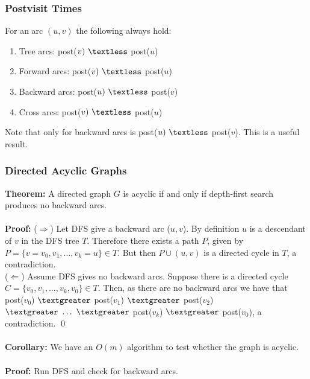 \documentclass{article}
\newcommand{\lt}{\textless}
\newcommand{\gt}{\textgreater}
\newcommand{\imply}{\Rightarrow}
\newcommand{\thm}{\textbf{Theorem: }}
\newcommand{\cor}{\textbf{Corollary: }}
\newcommand{\proo}{\textbf{Proof: }}
\begin{document}
\subsubsection{Postvisit Times}
For an arc $(u, v)$ the following always hold:
\begin{enumerate}
	\item Tree arcs: post($v)\ \lt$ post($u$)
	\item Forward arcs: post($v)\ \lt$ post($u$)
	\item Backward arcs: post($u)\ \lt$ post($v$)
	\item Cross arcs: post($v)\ \lt$ post($u$)
\end{enumerate}
Note that only for backward arcs is post($u)\ \lt$ post($v$). This is a useful result.
\subsubsection{Directed Acyclic Graphs}
\thm A directed graph $G$ is acyclic if and only if depth-first search produces no backward arcs.\\\\
\proo ($\imply$) Let DFS give a backward arc ($u, v$). By definition $u$ is a descendant of $v$ in the DFS tree $T$. Therefore there exists a path $P$, given by $P = \{v = v_0, v_1, \dots, v_k =u\} \in T$. But then $P \cup (u, v)$ is a directed cycle in $T$, a contradiction.\\
($\Leftarrow$) Assume DFS gives no backward arcs. Suppose there is a directed cycle $C = \{v_0, v_1, \dots, v_k, v_0\} \in T$. Then, as there are no backward arcs we have that post($v_0$) $\gt$ post($v_1$) $\gt$ post($v_2$) $\gt\ \dots\ \gt$ post($v_k$) $\gt$ post($v_0$), a contradiction.
\qed\\\\
\cor We have an $O(m)$ algorithm to test whether the graph is acyclic.\\\\
\proo Run DFS and check for backward arcs.
\end{document}
